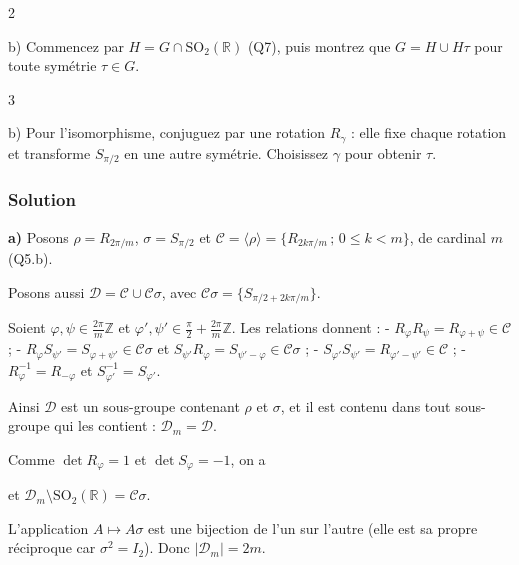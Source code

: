 \documentclass[11pt,a4paper]{article}
\newcommand{\equationajustee}[1]{%
  \sbox{\boiteequation}{$\displaystyle #1$}%
  \ifdim\wd\boiteequation>\linewidth
    \[\resizebox{\linewidth}{!}{\usebox{\boiteequation}}\]%
  \else
    \[#1\]%
  \fi}
\begin{document}
\begin{indication}{2}

b) Commencez par \(H=G\cap{\mathrm{SO}}_2(\mathbb{R})\) (Q7), puis montrez que \(G=H\cup H\tau\) pour toute symétrie \(\tau\in G\).

\end{indication}

\begin{indication}{3}

b) Pour l'isomorphisme, conjuguez par une rotation \(R_\gamma\) : elle fixe chaque rotation et transforme \(S_{\pi/2}\) en une autre symétrie. Choisissez \(\gamma\) pour obtenir \(\tau\).

\end{indication}

\hypertarget{solution-7}{%
\subsubsection{Solution}\label{solution-7}}

\textbf{a)} Posons \(\rho=R_{2\pi/m}\), \(\sigma=S_{\pi/2}\) et \(\mathcal{C}=\langle\rho\rangle=\{R_{2k\pi/m}\,;\,0\leqslant k<m\}\), de cardinal \(m\) (Q5.b).

Posons aussi \(\mathcal{D}=\mathcal{C}\cup\mathcal{C}\sigma\), avec \(\mathcal{C}\sigma=\{S_{\pi/2+2k\pi/m}\}\).

Soient \(\varphi,\psi\in\frac{2\pi}{m}\mathbb{Z}\) et \(\varphi',\psi'\in\frac\pi2+\frac{2\pi}{m}\mathbb{Z}\). Les relations donnent :
- \(R_\varphi R_\psi=R_{\varphi+\psi}\in\mathcal{C}\) ;
- \(R_\varphi S_{\psi'}=S_{\varphi+\psi'}\in\mathcal{C}\sigma\) et \(S_{\psi'}R_\varphi=S_{\psi'-\varphi}\in\mathcal{C}\sigma\) ;
- \(S_{\varphi'}S_{\psi'}=R_{\varphi'-\psi'}\in\mathcal{C}\) ;
- \(R_\varphi^{-1}=R_{-\varphi}\) et \(S_{\varphi'}^{-1}=S_{\varphi'}\).

Ainsi \(\mathcal{D}\) est un sous-groupe contenant \(\rho\) et \(\sigma\), et il est contenu dans tout sous-groupe qui les contient : \({\mathcal{D}}_m=\mathcal{D}\).

Comme \(\det R_\varphi=1\) et \(\det S_\varphi=-1\), on a

\equationajustee{{\mathcal{D}}_m\cap{\mathrm{SO}}_2(\mathbb{R})=\mathcal{C}=\langle R_{2\pi/m}\rangle,}

et \({\mathcal{D}}_m\setminus{\mathrm{SO}}_2(\mathbb{R})=\mathcal{C}\sigma\).

L'application \(A\mapsto A\sigma\) est une bijection de l'un sur l'autre (elle est sa propre réciproque car \(\sigma^2=I_2\)). Donc \(\boxed{|{\mathcal{D}}_m|=2m}\).
\end{document}
